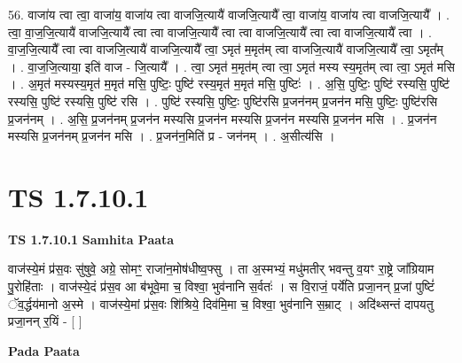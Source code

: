 \documentclass[17pt]{extarticle}
\begin{document}
56. वाजा॑य त्वा त्वा॒ वाजा॑य॒ वाजा॑य त्वा वाजजि॒त्यायै॑ वाजजि॒त्यायै᳚ त्वा॒ वाजा॑य॒ वाजा॑य त्वा वाजजि॒त्यायै᳚ । . त्वा॒ वा॒ज॒जि॒त्यायै॑ वाजजि॒त्यायै᳚ त्वा त्वा वाजजि॒त्यायै᳚ त्वा त्वा वाजजि॒त्यायै᳚ त्वा त्वा वाजजि॒त्यायै᳚ त्वा । . वा॒ज॒जि॒त्यायै᳚ त्वा त्वा वाजजि॒त्यायै॑ वाजजि॒त्यायै᳚ त्वा॒ ऽमृत॑ म॒मृत॑म् त्वा वाजजि॒त्यायै॑ वाजजि॒त्यायै᳚ त्वा॒ ऽमृत᳚म् । . वा॒ज॒जि॒त्याया॒ इति॑ वाज - जि॒त्यायै᳚ । . त्वा॒ ऽमृत॑ म॒मृत॑म् त्वा त्वा॒ ऽमृत॑ मस्य स्य॒मृत॑म् त्वा त्वा॒ ऽमृत॑ मसि । . अ॒मृत॑ मस्यस्य॒मृत॑ म॒मृत॑ मसि॒ पुष्टिः॒ पुष्टि॑ रस्य॒मृत॑ म॒मृत॑ मसि॒ पुष्टिः॑ । . अ॒सि॒ पुष्टिः॒ पुष्टि॑ रस्यसि॒ पुष्टि॑ रस्यसि॒ पुष्टि॑ रस्यसि॒ पुष्टि॑ रसि । . पुष्टि॑ रस्यसि॒ पुष्टिः॒ पुष्टि॑रसि प्र॒जन॑नम् प्र॒जन॑न मसि॒ पुष्टिः॒ पुष्टि॑रसि प्र॒जन॑नम् । . अ॒सि॒ प्र॒जन॑नम् प्र॒जन॑न मस्यसि प्र॒जन॑न मस्यसि प्र॒जन॑न मस्यसि प्र॒जन॑न मसि । . प्र॒जन॑न मस्यसि प्र॒जन॑नम् प्र॒जन॑न मसि । . प्र॒जन॑न॒मिति॑ प्र - जन॑नम् । . अ॒सीत्य॑सि । \newline
\pagebreak
{}

\section{ TS 1.7.10.1 }

\textbf{TS 1.7.10.1 } \newline
\textbf{Samhita Paata} \newline

वाज॑स्ये॒मं प्र॑स॒वः सु॑षुवे॒ अग्रे॒ सोमꣳ॒॒ राजा॑न॒मोष॑धीष्व॒फ्सु । ता अ॒स्मभ्यं॒ मधु॑मतीर् भवन्तु व॒यꣳ रा॒ष्ट्रे जा᳚ग्रियाम पु॒रोहि॑ताः । वाज॑स्ये॒दं प्र॑स॒व आ ब॑भूवे॒मा च॒ विश्वा॒ भुव॑नानि स॒र्वतः॑ । स वि॒राजं॒ पर्ये॑ति प्रजा॒नन् प्र॒जां पुष्टिं॑ ॅव॒र्द्धय॑मानो अ॒स्मे । वाज॑स्ये॒मां प्र॑स॒वः शि॑श्रिये॒ दिव॑मि॒मा च॒ विश्वा॒ भुव॑नानि स॒म्राट् । अदि॑थ्सन्तं दापयतु प्रजा॒नन् र॒यिं - [ ] \newline

\textbf{Pada Paata} \newline
\end{document}
